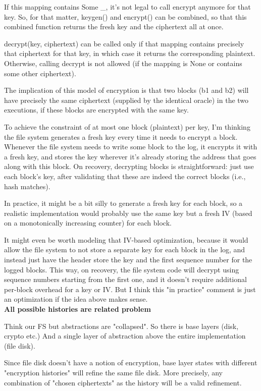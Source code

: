 \documentclass[onecolumn]{paper}
\begin{document}
		If this mapping contains Some \_, it's not legal to call encrypt anymore for that key.  So, for that matter, keygen() and encrypt() can be combined, so that this combined function returns the fresh key and the ciphertext all at once.
		
		decrypt(key, ciphertext) can be called only if that mapping contains precisely that ciphertext for that key, in which case it returns the corresponding plaintext.  Otherwise, calling decrypt is not allowed (if the mapping is None or contains some other ciphertext).
		
		The implication of this model of encryption is that two blocks (b1 and b2) will have precisely the same ciphertext (supplied by the identical oracle) in the two executions, if these blocks are encrypted with the same key.
		
		To achieve the constraint of at most one block (plaintext) per key, I'm thinking the file system generates a fresh key every time it needs to encrypt a block.  Whenever the file system needs to write some block to the log, it encrypts it with a fresh key, and stores the key wherever it's already storing the address that goes along with this block.  On recovery, decrypting blocks is straightforward: just use each block's key, after validating that these are indeed the correct blocks (i.e., hash matches).
		
		In practice, it might be a bit silly to generate a fresh key for each block, so a realistic implementation would probably use the same key but a fresh IV (based on a monotonically increasing counter) for each block.
		
		It might even be worth modeling that IV-based optimization, because it would allow the file system to not store a separate key for each block in the log, and instead just have the header store the key and the first sequence number for the logged blocks.  This way, on recovery, the file system code will decrypt using sequence numbers starting from the first one, and it doesn't require additional per-block overhead for a key or IV.
		But I think this "in practice" comment is just an optimization if the idea above makes sense.\\
		
		{\bf All possible histories are related problem}
		
		Think our FS but abstractions are "collapsed". So there is base layers (disk, crypto etc.) And a single layer of abstraction above the entire implementation (file disk).
		
		Since file disk doesn't have a notion of encryption, base layer states with different "encryption histories" will refine the same file disk. More precisely, any combination of "chosen ciphertexts" as the history will be a valid refinement.
		
\end{document}
